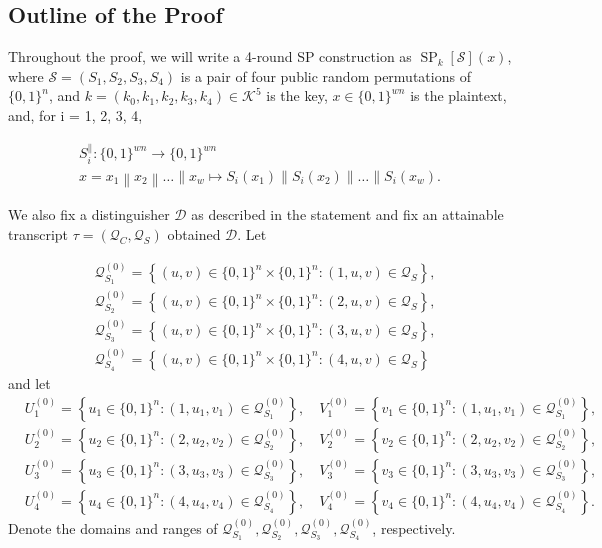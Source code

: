 \subsection{Outline of the Proof}
\label{sec:proof-sketch-4-rounds}

Throughout the proof, we will write a 4-round SP construction as $\operatorname{SP}_{k}[\mathcal{S}](x)$, where $\mathcal{S}=(S_1, S_2, S_3, S_4)$  is a pair of four public random permutations of $\{0,1\}^{n}$, and $k = (k_{0}, k_{1}, k_{2}, k_{3}, k_{4}) \in \mathcal{K}^{5}$ is the key, $x \in \{0,1\}^{w n}$ is the plaintext, and, for i = 1, 2, 3, 4,

$$
\begin{array}{c}
{S_{i}^{\|}:\{0,1\}^{w n} \rightarrow\{0,1\}^{w n}} \\
{x=x_{1}\left\|x_{2}\right\| \ldots\left\|x_{w} \longmapsto S_{i}\left(x_{1}\right)\right\| S_{i}\left(x_{2}\right)\|\ldots\| S_{i}\left(x_{w}\right)}.
\end{array}
$$

We also fix a distinguisher $\mathcal{D}$ as described in the statement and fix an attainable transcript $\tau =\left(\mathcal{Q}_{C}, \mathcal{Q}_{S}\right)$ obtained $\mathcal{D}$. Let

$$
\begin{aligned}
&\mathcal{Q}_{S_{1}}^{(0)}=\left\{(u, v) \in\{0,1\}^{n} \times\{0,1\}^{n}:(1, u, v) \in \mathcal{Q}_{S} \right\},\\
&\mathcal{Q}_{S_{2}}^{(0)}=\left\{(u, v) \in\{0,1\}^{n} \times\{0,1\}^{n}:(2, u, v) \in \mathcal{Q}_{S} \right\},\\
&\mathcal{Q}_{S_{3}}^{(0)}=\left\{(u, v) \in\{0,1\}^{n} \times\{0,1\}^{n}:(3, u, v) \in \mathcal{Q}_{S} \right\},\\
&\mathcal{Q}_{S_{4}}^{(0)}=\left\{(u, v) \in\{0,1\}^{n} \times\{0,1\}^{n}:(4, u, v) \in \mathcal{Q}_{S} \right\}
\end{aligned}
$$
%
and let
%
\begin{align*}
&U_{1}^{(0)}=\left\{u_{1} \in\{0,1\}^{n}:\left(1, u_{1}, v_{1}\right) \in \mathcal{Q}_{S_{1}}^{(0)}\right\}, \quad V_{1}^{(0)}=\left\{v_{1} \in\{0,1\}^{n}:\left(1, u_{1}, v_{1}\right) \in \mathcal{Q}_{S_{1}}^{(0)}\right\},\\
&U_{2}^{(0)}=\left\{u_{2} \in\{0,1\}^{n}:\left(2, u_{2}, v_{2}\right) \in \mathcal{Q}_{S_{2}}^{(0)}\right\}, \quad V_{2}^{(0)}=\left\{v_{2} \in\{0,1\}^{n}:\left(2, u_{2}, v_{2}\right) \in \mathcal{Q}_{S_{2}}^{(0)}\right\},\\
&U_{3}^{(0)}=\left\{u_{3} \in\{0,1\}^{n}:\left(3, u_{3}, v_{3}\right) \in \mathcal{Q}_{S_{3}}^{(0)}\right\}, \quad V_{3}^{(0)}=\left\{v_{3} \in\{0,1\}^{n}:\left(3, u_{3}, v_{3}\right) \in \mathcal{Q}_{S_{3}}^{(0)}\right\},\\
&U_{4}^{(0)}=\left\{u_{4} \in\{0,1\}^{n}:\left(4, u_{4}, v_{4}\right) \in \mathcal{Q}_{S_{4}}^{(0)}\right\}, \quad V_{4}^{(0)}=\left\{v_{4} \in\{0,1\}^{n}:\left(4, u_{4}, v_{4}\right) \in \mathcal{Q}_{S_{4}}^{(0)}\right\}.
\end{align*}
%
Denote the domains and ranges of $\mathcal{Q}_{S_{1}}^{(0)}, \mathcal{Q}_{S_{2}}^{(0)}, \mathcal{Q}_{S_{3}}^{(0)}, \mathcal{Q}_{S_{4}}^{(0)}$, respectively.



